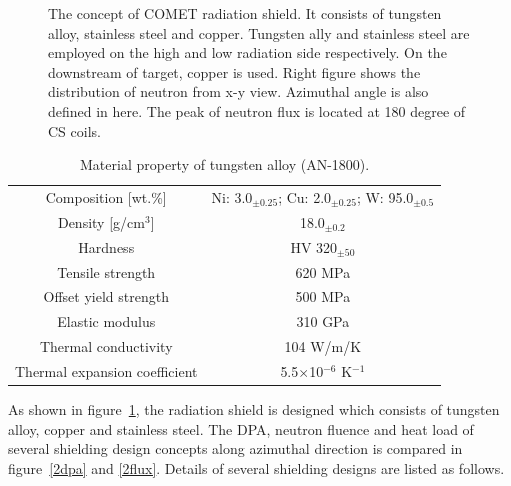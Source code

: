 \begin{figure}[H]
\begin{subfigure}{0.3\textwidth}
  \end{subfigure}
  \caption{The concept of COMET radiation shield. It consists of tungsten alloy, stainless steel and copper. Tungsten ally and stainless steel are employed on the high and low radiation side respectively. On the downstream of target, copper is used. Right figure shows the distribution of neutron from x-y view. Azimuthal angle is also defined in here. The peak of neutron flux is located at 180 degree of CS coils.}
  \label{2shieldgeo}
 \end{figure}
\begin{table}[H]
 \centering
 \begin{tabular}{cc} \hline \hline
  Composition [wt.\%] & Ni: 3.0$_{\pm 0.25}$; Cu: 2.0$_{\pm 0.25}$; W: 95.0$_{\pm 0.5}$ \\
  Density [g/cm$^3$] & 18.0$_{\pm 0.2}$ \\
  Hardness & HV 320$_{\pm 50}$ \\
  Tensile strength & 620 MPa \\
  Offset yield strength & 500 MPa \\
  Elastic modulus & 310 GPa \\
  Thermal conductivity & 104 W/m/K \\
  Thermal expansion coefficient & 5.5$\times$10$^{-6}$ K$^{-1}$ \\ \hline \hline
 \end{tabular}
 \caption{Material property of tungsten alloy (AN-1800).}
 \label{alloy}
\end{table}
As shown in figure~\ref{2shieldgeo}, the radiation shield is designed which consists of tungsten alloy, copper and stainless steel.
The DPA, neutron fluence and heat load of several shielding design concepts along azimuthal direction is compared in figure~\ref{2dpa} and \ref{2flux}.
Details of several shielding designs are listed as follows.
